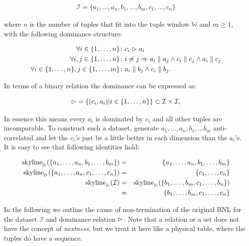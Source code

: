 \begin{eqnarray}
\mathcal{I} = \{a_1, \ldots, a_n, b_1, \ldots, b_m, c_1, \ldots, c_n\}
\end{eqnarray}

\noindent
where $n$ is the number of tuples that fit into the tuple window
$\mathbb{W}$ and $m \ge 1$, with the following dominance structure:

\begin{align}
\forall i \in \{1, \ldots, n\}\colon & c_i \vartriangleright a_i \label{eqn:bnlntds1} \\
\forall i, j \in \{1, \ldots, n\}\colon & i \neq j \Rightarrow a_i \parallel a_j \land c_i \parallel c_j \land a_i \parallel c_j \label{eqn:bnlntds2} \\
\forall i \in \{1, \ldots, n\}, j \in \{1, \ldots, m\}\colon & a_i \parallel b_j \land c_i \parallel b_j. \label{eqn:bnlntds3} 
\end{align}

\noindent
In terms of a binary relation the dominance can be expressed as:

\begin{equation}
\vartriangleright\; = \{(c_i, a_i) | i \in \{1, \ldots, n\}\} \subset \mathcal{I} \times \mathcal{I},
\end{equation}

\noindent
In essence this means every $a_i$ is dominated by $c_i$ and all other
tuples are incomparable.  To construct such a dataset, generate $a_1,
\ldots, a_n, b_1, \ldots b_m$ anti-correlated and let the $c_i$'s just be
a little better in each dimension than the $a_i$'s.  It is easy to see
that following identities hold:

\begin{eqnarray}
\skyline_\dominates(\{a_1, \ldots, a_n, b_1, \ldots, b_m\}) &=& \{a_1, \ldots, a_n, b_1, \ldots, b_m\} \\
\skyline_\dominates(\{a_1, \ldots, a_n, c_1, \ldots, c_n\}) &=& \{c_1, \ldots, c_n\} \\
\skyline_\dominates(\mathcal{I}) &=& \skyline_\dominates(\{b_1, \ldots, b_m, c_1, \ldots, b_n\}) \\
                      &=& \{b_1, \ldots, b_m, c_1, \ldots, c_n\}
\end{eqnarray}

In the following we outline the cause of non-termination of the
original BNL for the dataset $\mathcal{I}$ and dominance relation
$\vartriangleright$.  Note that a relation or a set does not have the concept
of \emph{nextness}, but we treat it here like a physical table, where
the tuples do have a sequence.

